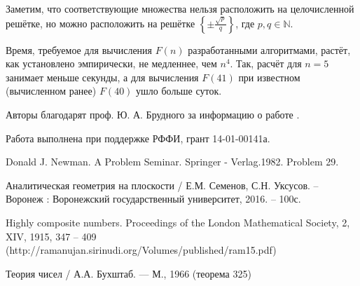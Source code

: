 \documentclass[a4paper,14pt]{article} %
\begin{document}
Заметим, что соответствующие множества нельзя расположить на целочисленной решётке, но можно расположить на решётке $\left\{\pm\frac{\sqrt{p}}{q}\right\}$, где $p,q \in \mathbb{N}$.



Время, требуемое для вычисления $F(n)$ разработанными алгоритмами, растёт, как установлено эмпирически, не медленнее, чем $n^4$.
Так, расчёт для $n=5$ занимает меньше секунды, а для вычисления $F(41)$ при известном (вычисленном ранее) $F(40)$ ушло больше суток.

Авторы благодарят проф. Ю. А. Брудного за информацию о работе \cite{Newman}.

Работа выполнена при поддержке РФФИ, грант 14-01-00141а.


\begin{thebibliography}{99}

 Donald J. Newman. A Problem Seminar. Springer - Verlag.1982. Problem 29.

 Аналитическая геометрия на плоскости / Е.М. Семенов, С.Н. Уксусов. – Воронеж : Воронежский государственный университет, 2016. – 100с.

 Highly composite numbers. Proceedings of the London Mathematical Society, 2, XIV, 1915, 347 – 409 (http://ramanujan.sirinudi.org/Volumes/published/ram15.pdf)

 Теория чисел / А.А. Бухштаб. --- М., 1966 (теорема 325)


\end{thebibliography}
\end{document}
